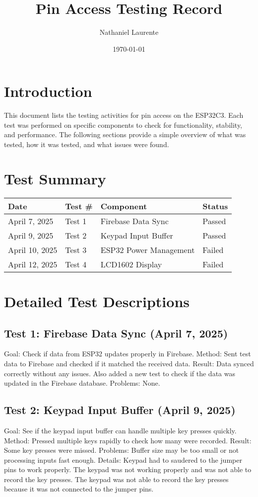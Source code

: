 \documentclass{article}
\title{Pin Access Testing Record}
\author{Nathaniel Laurente}
\date{\today}
\begin{document}
\maketitle

\section*{Introduction}
This document lists the testing activities for pin access on the ESP32C3. Each test was performed on specific components to check for functionality, stability, and performance. The following sections provide a simple overview of what was tested, how it was tested, and what issues were found.

\section*{Test Summary}
\begin{tabular}{| l | l | l | l |}
\hline
\textbf{Date} & \textbf{Test \#} & \textbf{Component} & \textbf{Status} \\
\hline
April 7, 2025 & Test 1 & Firebase Data Sync & Passed \\
April 9, 2025 & Test 2 & Keypad Input Buffer & Passed \\
April 10, 2025 & Test 3 & ESP32 Power Management & Failed \\
April 12, 2025 & Test 4 & LCD1602 Display & Failed \\


\hline
\end{tabular}

\section*{Detailed Test Descriptions}

\subsection*{Test 1: Firebase Data Sync (April 7, 2025)}
Goal: Check if data from ESP32 updates properly in Firebase.
Method: Sent test data to Firebase and checked if it matched the received data.
Result: Data synced correctly without any issues. Also added a new test to check if the data was updated in the Firebase database.
Problems: None.

\subsection*{Test 2: Keypad Input Buffer (April 9, 2025)}
Goal: See if the keypad input buffer can handle multiple key presses quickly.
Method: Pressed multiple keys rapidly to check how many were recorded.
Result: Some key presses were missed.
Problems: Buffer size may be too small or not processing inputs fast enough.
Details: Keypad had to saudered to the jumper pins to work properly. The keypad was not working properly and was not able to record the key presses. The keypad was not able to record the key presses because it was not connected to the jumper pins. 
\end{document}
